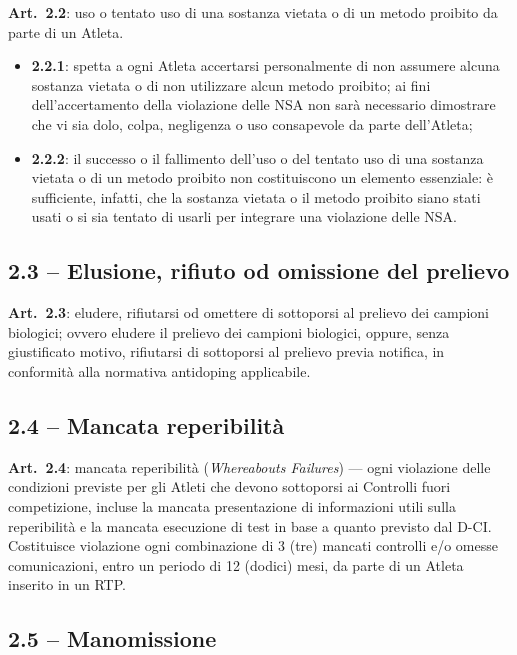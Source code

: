 \textbf{Art.\ 2.2}: uso o tentato uso di una sostanza vietata o di un metodo proibito da parte
di un Atleta.
\begin{itemize}
  \item \textbf{2.2.1}: spetta a ogni Atleta accertarsi personalmente di non assumere alcuna
    sostanza vietata o di non utilizzare alcun metodo proibito; ai fini dell'accertamento della
    violazione delle NSA non sarà necessario dimostrare che vi sia dolo, colpa, negligenza o uso
    consapevole da parte dell'Atleta;
  \item \textbf{2.2.2}: il successo o il fallimento dell'uso o del tentato uso di una sostanza
    vietata o di un metodo proibito non costituiscono un elemento essenziale: è sufficiente,
    infatti, che la sostanza vietata o il metodo proibito siano stati usati o si sia tentato di
    usarli per integrare una violazione delle NSA.
\end{itemize}

\subsection{2.3 -- Elusione, rifiuto od omissione del prelievo}

\textbf{Art.\ 2.3}: eludere, rifiutarsi od omettere di sottoporsi al prelievo dei campioni
biologici; ovvero eludere il prelievo dei campioni biologici, oppure, senza giustificato motivo,
rifiutarsi di sottoporsi al prelievo previa notifica, in conformità alla normativa antidoping
applicabile.

\subsection{2.4 -- Mancata reperibilità}

\textbf{Art.\ 2.4}: mancata reperibilità (\textit{Whereabouts Failures}) --- ogni violazione
delle condizioni previste per gli Atleti che devono sottoporsi ai Controlli fuori competizione,
incluse la mancata presentazione di informazioni utili sulla reperibilità e la mancata esecuzione
di test in base a quanto previsto dal D-CI. Costituisce violazione ogni combinazione di 3 (tre)
mancati controlli e/o omesse comunicazioni, entro un periodo di 12 (dodici) mesi, da parte di un
Atleta inserito in un RTP.

\subsection{2.5 -- Manomissione}

